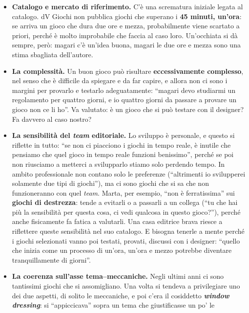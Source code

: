 \begin{itemize}
  \item \textbf{Catalogo e mercato di riferimento.} C'è una scrematura iniziale legata al
        catalogo. dV Giochi non pubblica giochi che superano i \textbf{45 minuti, un'ora}:
        se arriva un gioco che dura due ore e mezza, probabilmente viene scartato a
        priori, perché è molto improbabile che faccia al caso loro. Un'occhiata si dà
        sempre, però: magari c'è un'idea buona, magari le due ore e mezza sono una stima
        sbagliata dell'autore.
  \item \textbf{La complessità.} Un buon gioco può risultare \textbf{eccessivamente
        complesso}, nel senso che è difficile da spiegare e da far capire, e allora non ci
        sono i margini per provarlo e testarlo adeguatamente: ``magari devo studiarmi un
        regolamento per quattro giorni, e io quattro giorni da passare a provare un gioco
        non ce li ho''. Va valutato: è un gioco che si può testare con il designer? Fa
        davvero al caso nostro?
  \item \textbf{La sensibilità del \emph{team} editoriale.} Lo sviluppo è personale, e
        questo si riflette in tutto: ``se non ci piacciono i giochi in tempo reale, è
        inutile che pensiamo che quel gioco in tempo reale funzioni benissimo'', perché se
        poi non riusciamo a metterci a svilupparlo stiamo solo perdendo tempo. In ambito
        professionale non contano solo le preferenze (``altrimenti io svilupperei solamente
        due tipi di giochi''), ma ci sono giochi che si sa che non funzioneranno con quel
        \emph{team}. Marta, per esempio, ``non è ferratissima'' sui \textbf{giochi di
        destrezza}: tende a evitarli o a passarli a un collega (``tu che hai più la
        sensibilità per questa cosa, ci vedi qualcosa in questo gioco?''), perché anche
        fisicamente fa fatica a valutarli. Una casa editrice brava riesce a riflettere
        queste sensibilità nel suo catalogo. E bisogna tenerle a mente perché i giochi
        selezionati vanno poi testati, provati, discussi con i designer: ``quello che inizia
        come un processo di un'ora, un'ora e mezzo potrebbe diventare tranquillamente di
        giorni''.
  \item \textbf{La coerenza sull'asse tema--meccaniche.} Negli ultimi anni ci sono
        tantissimi giochi che si assomigliano. Una volta si tendeva a privilegiare uno dei
        due aspetti, di solito le meccaniche, e poi c'era il cosiddetto \textbf{\emph{window
        dressing}}: si ``appiccicava'' sopra un tema che giustificasse un po' le

\end{itemize}
